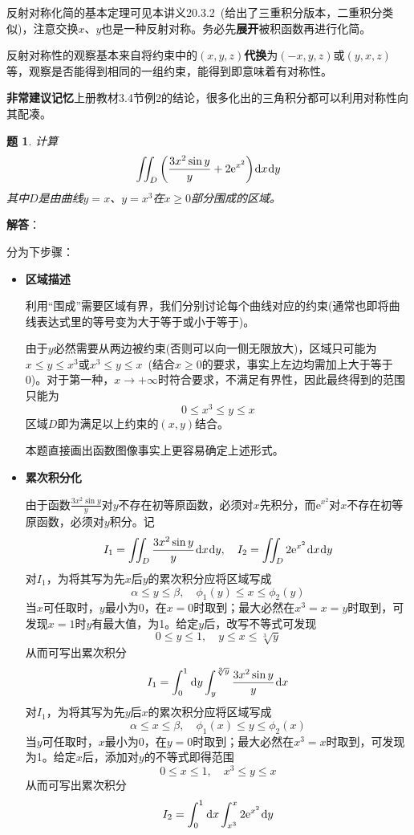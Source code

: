 \documentclass[a4paper,UTF8,fontset=windows,AutoFakeBold]{ctexart}
\newcommand*{\dr}{\hspace{0.07em}\mathrm{d}}
\newcommand*{\er}{\mathrm{e}}
\newcommand*{\note}{\noindent *}
\theoremstyle{ex}
\newtheorem{exercise}{题}
\newcommand{\sol}[1]{{\vspace{5pt}\kaishu\noindent\textbf{解答}：\vspace{-3pt}
\begin{compactitem}
    \item[] #1
\end{compactitem}
}}
\begin{document}
\note 反射对称化简的基本定理可见本讲义20.3.2\ (给出了三重积分版本，二重积分类似)，注意交换$x$、$y$也是一种反射对称。务必先\textbf{展开}被积函数再进行化简。

\note 反射对称性的观察基本来自将约束中的$(x,y,z)$\textbf{代换}为$(-x,y,z)$或$(y,x,z)$等，观察是否能得到相同的一组约束，能得到即意味着有对称性。

\note \textbf{非常建议记忆}上册教材3.4节例2的结论，很多化出的三角积分都可以利用对称性向其配凑。

\begin{framed}
\begin{exercise}
    计算
    $$\iint_D\bigg(\frac{3x^2\sin y}{y}+2\er^{x^2}\bigg)\dr x\dr y$$
    其中$D$是由曲线$y=x$、$y=x^3$在$x\ge0$部分围成的区域。
\end{exercise}
\sol{
    分为下步骤：
    \begin{itemize}
        \item \textbf{区域描述}
        
        利用``围成''需要区域有界，我们分别讨论每个曲线对应的约束(通常也即将曲线表达式里的等号变为大于等于或小于等于)。

        由于$y$必然需要从两边被约束(否则可以向一侧无限放大)，区域只可能为$x\le y\le x^3$或$x^3\le y\le x$\ (结合$x\ge0$的要求，事实上左边均需加上大于等于0)。对于第一种，$x\to+\infty$时符合要求，不满足有界性，因此最终得到的范围只能为
        $$0\le x^3\le y\le x$$
        区域$D$即为满足以上约束的$(x,y)$结合。

        \note 本题直接画出函数图像事实上更容易确定上述形式。

        \item \textbf{累次积分化}
        
        由于函数$\frac{3x^2\sin y}{y}$对$y$不存在初等原函数，必须对$x$先积分，而$\er^{x^2}$对$x$不存在初等原函数，必须对$y$积分。记
        $$I_1=\iint_D\frac{3x^2\sin y}{y}\dr x\dr y,\quad I_2=\iint_D2\er^{x^2}\dr x\dr y$$
        对$I_1$，为将其写为先$x$后$y$的累次积分应将区域写成
        $$\alpha\le y\le\beta,\quad\phi_1(y)\le x\le\phi_2(y)$$
        当$x$可任取时，$y$最小为0，在$x=0$时取到；最大必然在$x^3=x=y$时取到，可发现$x=1$时$y$有最大值，为1。给定$y$后，改写不等式可发现
        $$0\le y\le1,\quad y\le x\le\sqrt[3]{y}$$
        从而可写出累次积分
        $$I_1=\int_0^1\dr y\int_y^{\sqrt[3]{y}}\frac{3x^2\sin y}{y}\dr x$$
        对$I_1$，为将其写为先$y$后$x$的累次积分应将区域写成
        $$\alpha\le x\le\beta,\quad\phi_1(x)\le y\le\phi_2(x)$$
        当$y$可任取时，$x$最小为0，在$y=0$时取到；最大必然在$x^3=x$时取到，可发现为1。给定$x$后，添加对$y$的不等式即得范围
        $$0\le x\le1,\quad x^3\le y\le x$$
        从而可写出累次积分
        $$I_2=\int_0^1\dr x\int_{x^3}^x2\er^{x^2}\dr y$$


\end{itemize}}
\end{framed}
\end{document}

